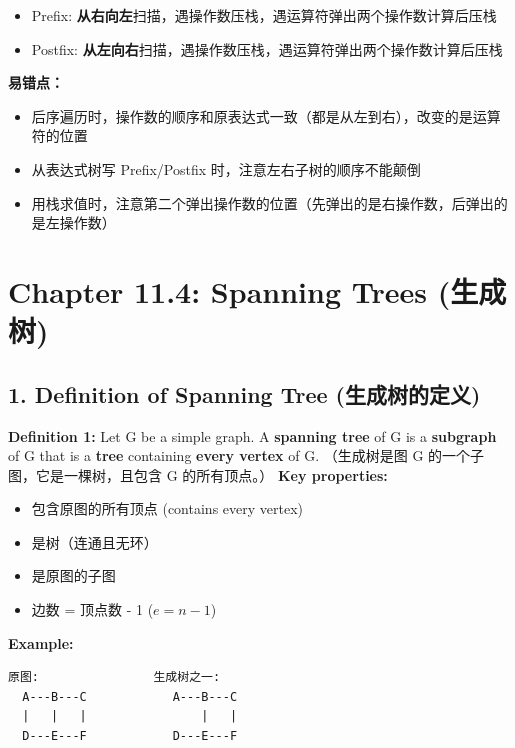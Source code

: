 \documentclass[10pt,a4paper,openany]{ctexbook}
\theoremstyle{definition}
\theoremstyle{remark}
\begin{document}
\begin{itemize}
\item Prefix: \textbf{从右向左}扫描，遇操作数压栈，遇运算符弹出两个操作数计算后压栈
\item Postfix: \textbf{从左向右}扫描，遇操作数压栈，遇运算符弹出两个操作数计算后压栈

\end{itemize}

\textbf{易错点：}
\begin{itemize}
\item 后序遍历时，操作数的顺序和原表达式一致（都是从左到右），改变的是运算符的位置
\item 从表达式树写 Prefix/Postfix 时，注意左右子树的顺序不能颠倒
\item 用栈求值时，注意第二个弹出操作数的位置（先弹出的是右操作数，后弹出的是左操作数）

\end{itemize}


\section{Chapter 11.4: Spanning Trees (生成树)}

\vspace{-2pt}

\subsection{1. Definition of Spanning Tree (生成树的定义)}

\textbf{Definition 1:} Let G be a simple graph. A \textbf{spanning tree} of G is a \textbf{subgraph} of G that is a \textbf{tree} containing \textbf{every vertex} of G.
（生成树是图 G 的一个子图，它是一棵树，且包含 G 的所有顶点。）
\textbf{Key properties:}
\begin{itemize}
\item 包含原图的所有顶点 (contains every vertex)
\item 是树（连通且无环）
\item 是原图的子图
\item 边数 = 顶点数 - 1 ($e = n - 1$)

\end{itemize}

\textbf{Example:}
{\footnotesize\begin{verbatim}
原图:                生成树之一:
  A---B---C            A---B---C
  |   |   |                |   |
  D---E---F            D---E---F
\end{verbatim}}
\end{document}

